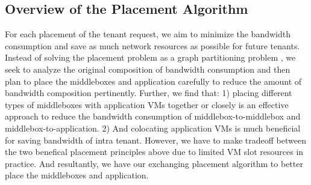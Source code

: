 \documentclass[review]{elsarticle}
\begin{document}

\subsection{Overview of the Placement Algorithm}
For each placement of the tenant request, we aim to minimize the bandwidth consumption and save as much network resources as possible for future tenants. Instead of solving the placement problem as a graph partitioning problem \cite{stratos12}, we seek to analyze the original composition of bandwidth consumption and then plan to place the middleboxes and application carefully to reduce the amount of bandwidth composition pertinently.
Further, we find that: 1) placing different types of middleboxes with application VMs together or closely is an effective approach to reduce the bandwidth consumption of middlebox-to-middlebox and middlebox-to-application. 2) And colocating application VMs is much beneficial for saving bandwidth of intra tenant. However, we have to make tradeoff between the two benefical placement principles above  due to limited VM slot resources in practice. And resultantly, we have our exchanging placement algorithm to better place the middleboxes and application. 



\end{document}
